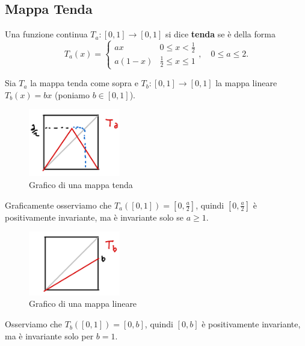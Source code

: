 \subsection{Mappa Tenda}

\begin{definition}
Una funzione continua $T_a:[0,1]\to[0,1]$ si dice \textbf{tenda} se \`e della forma
\[T_a(x)=\begin{cases}
ax & 0\leq x< \frac12\\
a(1-x) & \frac12\leq x\leq 1
\end{cases},\quad 0\leq a\leq 2.\]
\end{definition}

\begin{example}
Sia $T_a$ la mappa tenda come sopra e $T_b:[0,1]\to [0,1]$ la mappa lineare $T_b(x)=bx$ (poniamo $b\in [0,1]$).
\begin{figure}[!htb]
    \centering
    \includegraphics[width=4cm]{Immagini/Insieme_invariante_tenda.png}
    \caption{Grafico di una mappa tenda}
\end{figure}
Graficamente osserviamo che $T_a([0,1])=[0,\frac a2]$, quindi $[0,\frac a2]$ \`e positivamente invariante, ma \`e invariante solo se $a\geq 1$.
\begin{figure}[!htb]
    \centering
    \includegraphics[width=4cm]{Immagini/Insieme_invariante_lineare.png}
    \caption{Grafico di una mappa lineare}
\end{figure}
Osserviamo che $T_b([0,1])=[0,b]$, quindi $[0,b]$ \`e positivamente invariante, ma \`e invariante solo per $b=1$.
\end{example}

